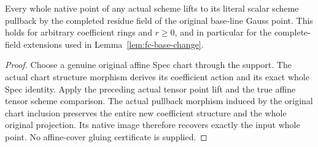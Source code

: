 \begin{lemma}
\label{lem:fc-scheme-gauss-scalar-lift}
\leanok
{}
Every whole native point of any actual scheme lifts to its literal
scalar scheme pullback by the completed residue field of the original
base-line Gauss point. This holds for arbitrary coefficient rings and
$r\ge0$, and in particular for the complete-field extensions used
in Lemma~\ref{lem:fc-base-change}.
\end{lemma}
\begin{proof}
Choose a genuine original affine Spec chart through the support. The
actual chart structure morphism derives its coefficient action and
its exact whole Spec identity. Apply the preceding actual tensor
point lift and the true affine tensor scheme comparison. The actual
pullback morphism induced by the original chart inclusion preserves
the entire new coefficient structure and the whole original
projection. Its native image therefore recovers exactly the input
whole point. No affine-cover gluing certificate is supplied.
\end{proof}

